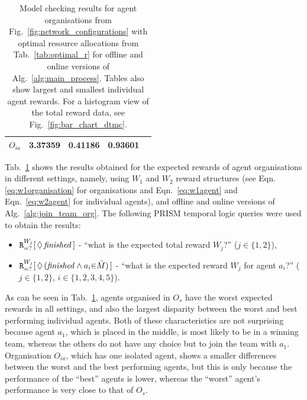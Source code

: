 \documentclass{llncs}
\begin{document}
\begin{table}[t]
{\begin{tabular}{ | l | l | l | l | l |}
    $O_{ia}$  & 3.37359 & 0.41186 & 0.93601  \\ \hline
\end{tabular}
}
\caption{Model checking results for agent organisations from Fig.~\ref{fig:network_configurations} with optimal resource allocations from Tab.~\ref{tab:optimal_r} for offline and online versions of Alg.~\ref{alg:main_process}. Tables also show largest and smallest individual agent rewards. For a histogram view of the total reward data, see Fig.~\ref{fig:bar_chart_dtmc}.}
\label{tab:dtmc_results}
\end{table}

Tab.~\ref{tab:dtmc_results} shows the results obtained for the expected rewards of agent organisations in different settings, namely, using $W_1$ and $W_2$ reward structures (see Eqn. \eqref{eq:w1organisation} %
for organisations and Eqn.~\eqref{eq:w1agent} and Eqn.~\eqref{eq:w2agent} for individual agents), and offline and online versions of Alg.~\ref{alg:join_team_org}. The following PRISM temporal logic queries were used to obtain the results:
\begin{itemize}
 \item ${\tt R}_{=?}^{W_{j}}[\,\Diamond\,\mathit{finished}\,]$ -
``what is the expected total reward $W_j$?'' ($j\in\{1,2\}$),
 \item ${\tt R}_{=?}^{W_{j}}[\,\Diamond\,(\mathit{finished} \wedge a_i {\in} \bar{M}) \,]$ -
``what is the expected reward $W_j$ for agent $a_i$?'' ($j\in\{1,2\}$, $i\in\{1,2,3,4,5\}$).
\end{itemize}
As can be seen in Tab.~\ref{tab:dtmc_results}, agents organised in $O_s$ have the worst expected rewards in all settings, and also the largest disparity between the worst and best performing individual agents. Both of these characteristics are not surprising because agent $a_1$, which is placed in the middle, is most likely to be in a winning team, whereas the others do not have any choice but to join the team with $a_1$. Organisation $O_{ia}$, which has one isolated agent, shows a smaller differences between the worst and the best performing agents, but this is only because the performance of the ``best'' agents is lower, whereas the ``worst'' agent's performance is very close to that of $O_s$.
\end{document}
